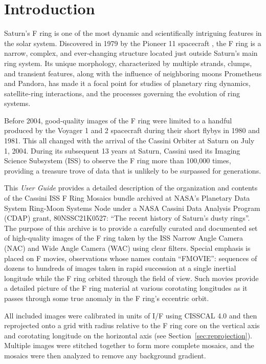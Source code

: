 
\section{Introduction}
\label{sec:introduction}

Saturn’s F ring is one of the most dynamic and scientifically intriguing features in the solar system. Discovered in 1979 by the Pioneer 11 spacecraft , the F ring is a narrow, complex, and ever-changing structure located just outside Saturn’s main ring system. Its unique morphology, characterized by multiple strands, clumps, and transient features, along with the influence of neighboring moons Prometheus and Pandora, has made it a focal point for studies of planetary ring dynamics, satellite-ring interactions, and the processes governing the evolution of ring systems.

Before 2004, good-quality images of the F ring were limited to a handful produced by the Voyager 1 and 2 spacecraft during their short flybys in 1980 and 1981. This all changed with the arrival of the Cassini Orbiter at Saturn on July 1, 2004. During its subsequent 13 years at Saturn, Cassini used its Imaging Science Subsystem (ISS)  to observe the F ring more than 100,000 times, providing a treasure trove of data that is unlikely to be surpassed for generations.

This \textit{User Guide} provides a detailed description of the organization and contents of the Cassini ISS F Ring Mosaics bundle archived at NASA’s Planetary Data System Ring-Moon Systems Node under a NASA Cassini Data Analysis Program (CDAP) grant, 80NSSC21K0527: “The recent history of Saturn’s dusty rings”. The purpose of this archive is to provide a carefully curated and documented set of high-quality images of the F ring taken by the ISS Narrow Angle Camera (NAC) and Wide Angle Camera (WAC)  using clear filters. Special emphasis is placed on F movies, observations whose names contain “FMOVIE”: sequences of dozens to hundreds of images taken in rapid succession at a single inertial longitude while the F ring orbited through the field of view. Such movies provide a detailed picture of the F ring material at various corotating longitudes as it passes through some true anomaly in the F ring’s eccentric orbit.

All included images were calibrated in units of I/F using CISSCAL 4.0  and then reprojected onto a grid with radius relative to the F ring core on the vertical axis and corotating longitude on the horizontal axis (see Section~\ref{sec:reprojection}). Multiple images were stitched together to form more complete mosaics, and the mosaics were then analyzed to remove any background gradient.

